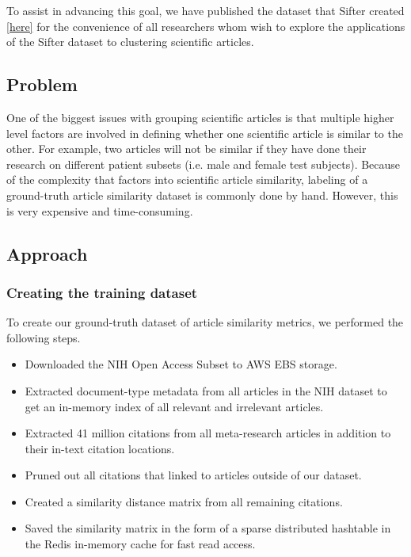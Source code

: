 \documentclass[12pt,twoside]{article}
\begin{document}
To assist in advancing this goal, we have published the dataset that Sifter created \href{http://nlp-dataset-6806-2015.s3.amazonaws.com/index.html}{[here]} for the convenience of all researchers whom wish to explore the applications of the Sifter dataset to clustering scientific articles.

\subsection{Problem}

One of the biggest issues with grouping scientific articles is that multiple higher level factors are involved in defining whether one scientific article is similar to the other. For example, two articles will not be similar if they have done their research on different patient subsets (i.e. male and female test subjects). Because of the complexity that factors into scientific article similarity, labeling of a ground-truth article similarity dataset is commonly done by hand. However, this is very expensive and time-consuming.


\subsection{Approach}

\subsubsection{Creating the training dataset}

To create our ground-truth dataset of article similarity metrics,  we performed the following steps.

\begin{itemize}
	\item Downloaded the NIH Open Access Subset to AWS EBS storage.
	\item Extracted document-type metadata from all articles in the NIH dataset to get an in-memory index of all relevant and irrelevant articles.
	\item Extracted 41 million citations from all meta-research articles in addition to their in-text citation locations.
	\item Pruned out all citations that linked to articles outside of our dataset.
	\item Created a similarity distance matrix from all remaining citations.
	\item Saved the similarity matrix in the form of a sparse distributed hashtable in the Redis in-memory cache for fast read access.
\end{itemize}
\end{document}
